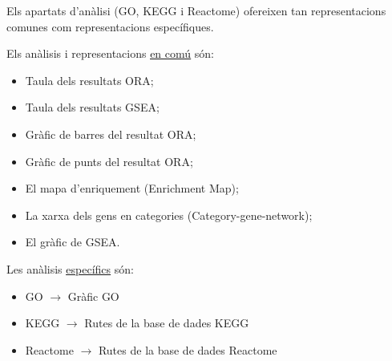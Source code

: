 \documentclass[]{article}
\begin{document}
Els apartats d'anàlisi (GO, KEGG i Reactome) ofereixen tan representacions comunes com representacions específiques. 

Els anàlisis i representacions \hyperref[sec:ACom]{\underline{en comú}} són:

\begin{itemize}
\item Taula dels resultats ORA;
\item Taula dels resultats GSEA;
\item Gràfic de barres del resultat ORA;
\item Gràfic de punts del resultat ORA;
\item El mapa d'enriquement (Enrichment Map);
\item La xarxa dels gens en categories (Category-gene-network);
\item El gràfic de GSEA.
\end{itemize} 

Les anàlisis \hyperref[sec:ASpec]{\underline{específics}} són:

\begin{itemize}
\item GO $\rightarrow$ Gràfic GO 
\item KEGG $\rightarrow$ Rutes de la base de dades KEGG
\item Reactome $\rightarrow$ Rutes de la base de dades Reactome
\end{itemize}
\end{document}
